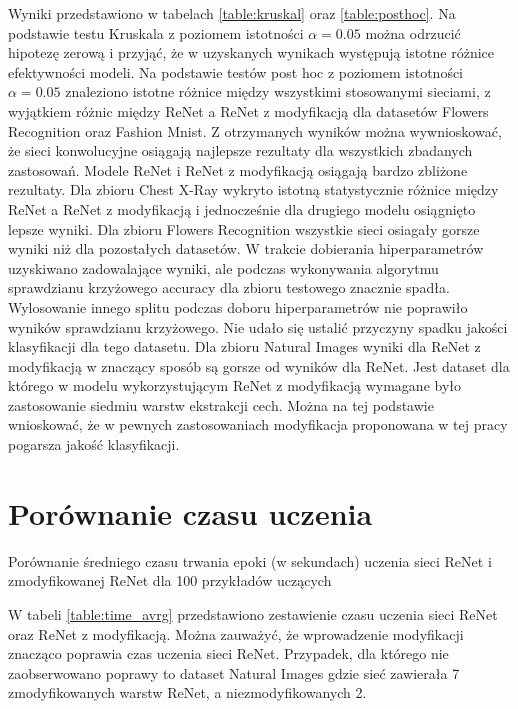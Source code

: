 \documentclass[oneside, mag]{mgr}
\begin{document}
Wyniki przedstawiono w tabelach \ref{table:kruskal} oraz \ref{table:posthoc}. Na podstawie testu Kruskala z poziomem istotności $\alpha = 0.05$ można odrzucić hipotezę zerową i przyjąć, że w uzyskanych wynikach występują istotne różnice efektywności modeli. Na podstawie testów post hoc z poziomem istotności $\alpha = 0.05$ znaleziono istotne różnice między wszystkimi stosowanymi sieciami, z wyjątkiem różnic między ReNet a ReNet z modyfikacją dla datasetów Flowers Recognition oraz Fashion Mnist. Z otrzymanych wyników można wywnioskować, że sieci konwolucyjne osiągają najlepsze rezultaty dla wszystkich zbadanych zastosowań. Modele ReNet i ReNet z modyfikacją osiągają bardzo zbliżone rezultaty. Dla zbioru Chest X-Ray wykryto istotną statystycznie różnice między ReNet a ReNet z modyfikacją i jednocześnie dla drugiego modelu osiągnięto lepsze wyniki. Dla zbioru Flowers Recognition wszystkie sieci osiagały gorsze wyniki niż dla pozostałych datasetów. W trakcie dobierania hiperparametrów uzyskiwano zadowalające wyniki, ale podczas wykonywania algorytmu sprawdzianu krzyżowego accuracy dla zbioru testowego znacznie spadła. Wylosowanie innego splitu podczas doboru hiperparametrów nie poprawiło wyników sprawdzianu krzyżowego. Nie udało się ustalić przyczyny spadku jakości klasyfikacji dla tego datasetu. Dla zbioru Natural Images wyniki dla ReNet z modyfikacją w znaczący sposób są gorsze od wyników dla ReNet. Jest dataset dla którego w modelu wykorzystującym ReNet z modyfikacją wymagane było zastosowanie siedmiu warstw ekstrakcji cech. Można na tej podstawie wnioskować, że w pewnych zastosowaniach modyfikacja proponowana w tej pracy pogarsza jakość klasyfikacji.

\section{Porównanie czasu uczenia}

\begin{table}[ht]
    \centering
    \caption{Porównanie średniego czasu trwania epoki (w sekundach) uczenia sieci ReNet i zmodyfikowanej ReNet dla 100 przykładów uczących}
    
    \label{table:time_avrg}
\end{table}

W tabeli \ref{table:time_avrg} przedstawiono zestawienie czasu uczenia sieci ReNet oraz ReNet z modyfikacją. Można zauważyć, że wprowadzenie modyfikacji znacząco poprawia czas uczenia sieci ReNet. Przypadek, dla którego nie zaobserwowano poprawy to dataset Natural Images gdzie sieć zawierała 7 zmodyfikowanych warstw ReNet, a niezmodyfikowanych 2.
\end{document}
